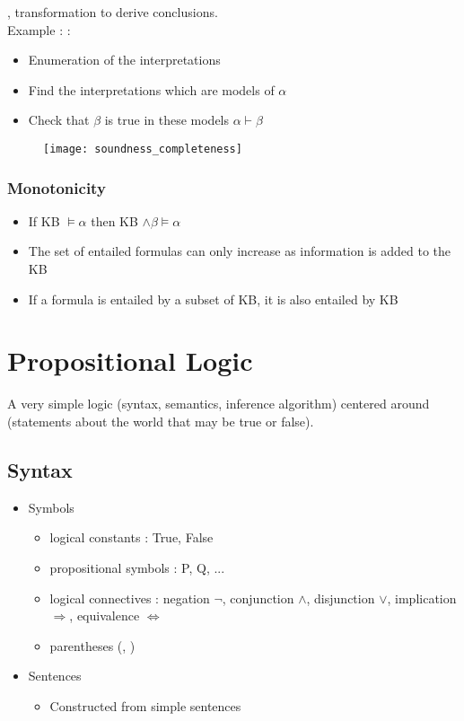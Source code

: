 , transformation to derive conclusions.\\
Example :  :
\begin{itemize}
\item Enumeration of the interpretations
\item Find the interpretations which are models of $\alpha$
\item Check that $\beta$ is true in these models $\alpha \vdash \beta$
\end{itemize}

\begin{figure}[H]
    \centering
    \texttt{[image: soundness\_completeness]}
\end{figure}

\subsubsection{Monotonicity}

\begin{itemize}
\item If KB $\models \alpha$ then KB $\land \beta \models \alpha$
\item The set of entailed formulas can only increase as information is added to the KB
\item If a formula is entailed by a subset of KB, it is also entailed by KB
\end{itemize}

\newpage
\section{Propositional Logic}

A very simple logic (syntax, semantics, inference algorithm) centered around  (statements about the world that may be true or false).

\subsection{Syntax}

\begin{itemize}
\item Symbols
	\begin{itemize}
	\item logical constants : True, False
	\item propositional symbols : P, Q, ...
	\item logical connectives : negation $\neg$, conjunction $\land$, disjunction $\lor$, implication $\Rightarrow$, equivalence $\iff$
	\item parentheses (, )
	\end{itemize}
\item Sentences
	\begin{itemize}
	\item Constructed from simple sentences
	\end{itemize}
\end{itemize}

